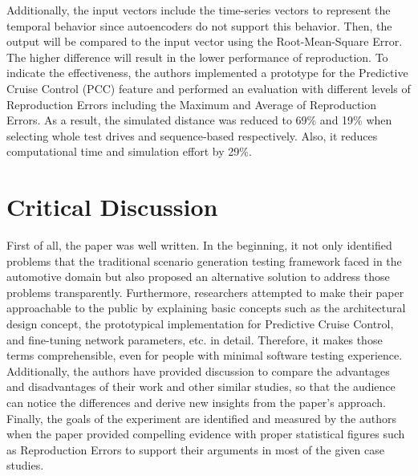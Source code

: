 \documentclass[10pt,a4paper]{report}
\begin{document}
%
Additionally, the input vectors include the time-series vectors to represent the temporal behavior since autoencoders do not support this behavior.
%
Then, the output will be compared to the input vector using the Root-Mean-Square Error.
%
The higher difference will result in the lower performance of reproduction.
%
To indicate the effectiveness, the authors implemented a prototype for the Predictive Cruise Control (PCC) feature and performed an evaluation with different levels of Reproduction Errors including the Maximum and Average of Reproduction Errors.
%
As a result, the simulated distance was reduced to 69\% and 19\% when selecting whole test drives and sequence-based respectively. Also, it reduces computational time and simulation effort by 29\%.


\section{Critical Discussion}
First of all, the paper was well written. In the beginning, it not only identified problems that the traditional scenario generation testing framework faced in the automotive domain but also proposed an alternative solution to address those problems transparently.
%
Furthermore, researchers attempted to make their paper approachable to the public by explaining basic concepts such as the architectural design concept, the prototypical implementation for Predictive Cruise Control, and fine-tuning network parameters, etc. in detail. Therefore, it makes those terms comprehensible, even for people with minimal software testing experience.
%
Additionally, the authors have provided discussion to compare the advantages and disadvantages of their work and other similar studies, so that the audience can notice the differences and derive new insights from the paper's approach.
%
Finally, the goals of the experiment are identified and measured by the authors when the paper provided compelling evidence with proper statistical figures such as Reproduction Errors to support their arguments in most of the given case studies.
%
\end{document}
